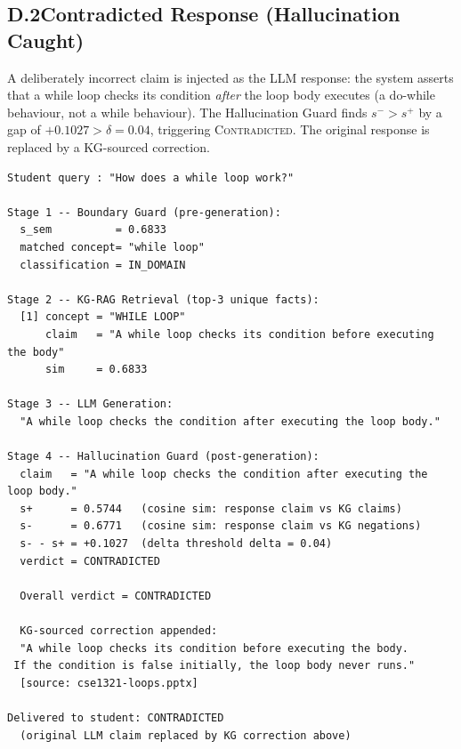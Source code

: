 \subsection*{D.2\quad Contradicted Response (Hallucination Caught)}
A deliberately incorrect claim is injected as the LLM response: the system asserts that a while loop checks its condition \emph{after} the loop body executes (a do-while behaviour, not a while behaviour). The Hallucination Guard finds $s^- > s^+$ by a gap of $+0.1027 > \delta = 0.04$, triggering \textsc{Contradicted}. The original response is replaced by a KG-sourced correction.
\begin{small}
\begin{verbatim}
Student query : "How does a while loop work?"

Stage 1 -- Boundary Guard (pre-generation):
  s_sem          = 0.6833
  matched concept= "while loop"
  classification = IN_DOMAIN

Stage 2 -- KG-RAG Retrieval (top-3 unique facts):
  [1] concept = "WHILE LOOP"
      claim   = "A while loop checks its condition before executing the body"
      sim     = 0.6833

Stage 3 -- LLM Generation:
  "A while loop checks the condition after executing the loop body."

Stage 4 -- Hallucination Guard (post-generation):
  claim   = "A while loop checks the condition after executing the loop body."
  s+      = 0.5744   (cosine sim: response claim vs KG claims)
  s-      = 0.6771   (cosine sim: response claim vs KG negations)
  s- - s+ = +0.1027  (delta threshold delta = 0.04)
  verdict = CONTRADICTED

  Overall verdict = CONTRADICTED

  KG-sourced correction appended:
  "A while loop checks its condition before executing the body.
 If the condition is false initially, the loop body never runs."
  [source: cse1321-loops.pptx]

Delivered to student: CONTRADICTED
  (original LLM claim replaced by KG correction above)
\end{verbatim}
\end{small}

